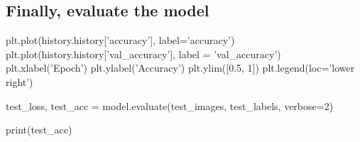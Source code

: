 \documentclass[%
oneside,                 %
final,                   %
10pt]{article}
\begin{document}
\subsection{Finally, evaluate the model}













\bpycod
plt.plot(history.history['accuracy'], label='accuracy')
plt.plot(history.history['val_accuracy'], label = 'val_accuracy')
plt.xlabel('Epoch')
plt.ylabel('Accuracy')
plt.ylim([0.5, 1])
plt.legend(loc='lower right')

test_loss, test_acc = model.evaluate(test_images,  test_labels, verbose=2)

print(test_acc)


\epycod




\end{document}
